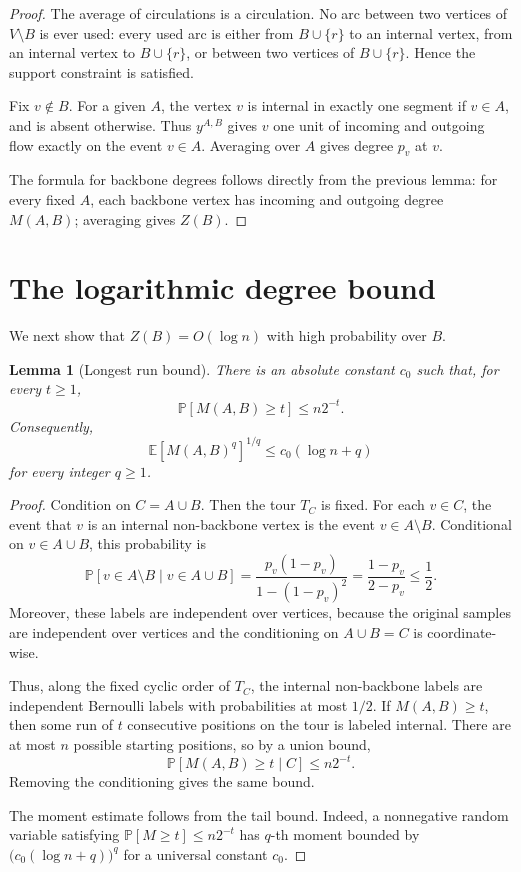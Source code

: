 \documentclass[11pt]{article}
\newtheorem{lemma}{Lemma}
\newcommand{\E}{\mathbb{E}}
\newcommand{\Prb}{\mathbb{P}}
\newcommand{\1}{\mathbf{1}}
\begin{document}
\begin{proof}
The average of circulations is a circulation.  No arc between two vertices of
$V\setminus B$ is ever used: every used arc is either from $B\cup\{r\}$ to an
internal vertex, from an internal vertex to $B\cup\{r\}$, or between two
vertices of $B\cup\{r\}$.  Hence the support constraint is satisfied.

Fix $v\notin B$.  For a given $A$, the vertex $v$ is internal in exactly one
segment if $v\in A$, and is absent otherwise.  Thus $y^{A,B}$ gives $v$ one
unit of incoming and outgoing flow exactly on the event $v\in A$.  Averaging
over $A$ gives degree $p_v$ at $v$.

The formula for backbone degrees follows directly from the previous lemma:
for every fixed $A$, each backbone vertex has incoming and outgoing degree
$M(A,B)$; averaging gives $Z(B)$.
\end{proof}

\section{The logarithmic degree bound}

We next show that $Z(B)=O(\log n)$ with high probability over $B$.

\begin{lemma}[Longest run bound]
There is an absolute constant $c_0$ such that, for every $t\ge 1$,
\[
  \Prb[M(A,B)\ge t]\le n2^{-t}.
\]
Consequently,
\[
  \E[M(A,B)^q]^{1/q}\le c_0(\log n+q)
\]
for every integer $q\ge 1$.
\end{lemma}

\begin{proof}
Condition on $C=A\cup B$.  Then the tour $T_C$ is fixed.  For each
$v\in C$, the event that $v$ is an internal non-backbone vertex is the event
$v\in A\setminus B$.  Conditional on $v\in A\cup B$, this probability is
\[
  \Prb[v\in A\setminus B\mid v\in A\cup B]
  =\frac{p_v(1-p_v)}{1-(1-p_v)^2}
  =\frac{1-p_v}{2-p_v}
  \le \frac12.
\]
Moreover, these labels are independent over vertices, because the original
samples are independent over vertices and the conditioning on $A\cup B=C$ is
coordinate-wise.

Thus, along the fixed cyclic order of $T_C$, the internal non-backbone labels
are independent Bernoulli labels with probabilities at most $1/2$.  If
$M(A,B)\ge t$, then some run of $t$ consecutive positions on the tour is labeled
internal.  There are at most $n$ possible starting positions, so by a union
bound,
\[
  \Prb[M(A,B)\ge t\mid C]\le n2^{-t}.
\]
Removing the conditioning gives the same bound.

The moment estimate follows from the tail bound.  Indeed, a nonnegative random
variable satisfying $\Prb[M\ge t]\le n2^{-t}$ has $q$-th moment bounded by
$\bigl(c_0(\log n+q)\bigr)^q$ for a universal constant $c_0$.
\end{proof}
\end{document}
